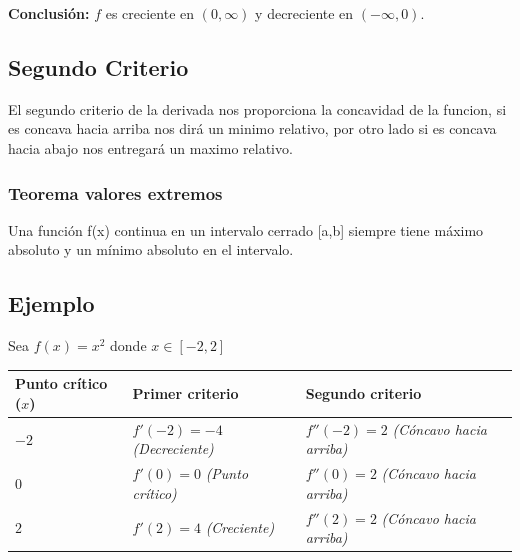 \documentclass[12pt]{article}
\begin{document}
\textbf{Conclusión:}  
$f$ es creciente en $(0,\infty)$ y decreciente en $(-\infty,0)$.







\subsection{Segundo Criterio}

El segundo criterio de la derivada nos proporciona la concavidad de la funcion, si es concava hacia arriba nos dirá un minimo relativo, por otro lado si es concava hacia abajo nos entregará un maximo relativo.
\subsubsection{Teorema valores extremos}
Una función f(x) continua en un intervalo cerrado [a,b] siempre tiene máximo absoluto y un mínimo absoluto en el intervalo.

\subsection*{Ejemplo}
Sea $f(x)=x^2$ donde $x \in [-2,2]$

\begin{table}[h]
\centering
\renewcommand{\arraystretch}{1.5} %
\small
\begin{tabular}{lp{5cm}p{5cm}}
\toprule
\textbf{Punto crítico ($x$)} & \textbf{Primer criterio}  & \textbf{Segundo criterio}  \\
\midrule
$-2$ & $f'(-2) = -4$ \newline \textit{(Decreciente)} & $f''(-2) = 2$ \newline \textit{(Cóncavo hacia arriba)} \\
\addlinespace
$0$ & $f'(0) = 0$ \newline \textit{(Punto crítico)} & $f''(0) = 2$ \newline \textit{(Cóncavo hacia arriba)} \\
\addlinespace
$2$ & $f'(2) = 4$ \newline \textit{(Creciente)} & $f''(2) = 2$ \newline \textit{(Cóncavo hacia arriba)} \\
\bottomrule
\end{tabular}
\end{table}
\end{document}
